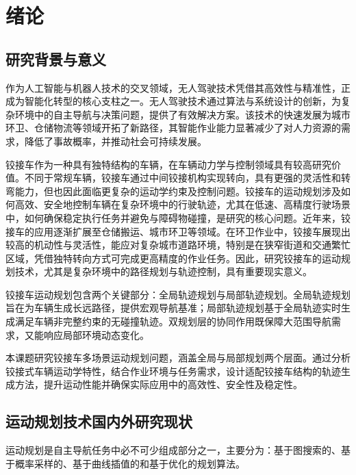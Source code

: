 \documentclass[master,academic]{ysuthesis} %
\begin{document}

	\customizedtableofcontents

	\chapter{绪论}
	\section{研究背景与意义}
	作为人工智能与机器人技术的交叉领域，无人驾驶技术凭借其高效性与精准性，正成为智能化转型的核心支柱之一。无人驾驶技术通过算法与系统设计的创新，为复杂环境中的自主导航与决策问题，提供了有效解决方案。该技术的快速发展为城市环卫、仓储物流等领域开拓了新路径，其智能作业能力显著减少了对人力资源的需求，降低了事故概率，并推动社会可持续发展。

	铰接车作为一种具有独特结构的车辆，在车辆动力学与控制领域具有较高研究价值。不同于常规车辆，铰接车通过中间铰接机构实现转向，具有更强的灵活性和转弯能力，但也因此面临更复杂的运动学约束及控制问题。铰接车的运动规划涉及如何高效、安全地控制车辆在复杂环境中的行驶轨迹，尤其在低速、高精度行驶场景中，如何确保稳定执行任务并避免与障碍物碰撞，是研究的核心问题。近年来，铰接车的应用逐渐扩展至仓储搬运、城市环卫等领域。在环卫作业中，铰接车展现出较高的机动性与灵活性，能应对复杂城市道路环境，特别是在狭窄街道和交通繁忙区域，凭借独特转向方式可完成更高精度的作业任务。因此，研究铰接车的运动规划技术，尤其是复杂环境中的路径规划与轨迹控制，具有重要现实意义。
	
	铰接车运动规划包含两个关键部分：全局轨迹规划与局部轨迹规划。全局轨迹规划旨在为车辆生成长远路径，提供宏观导航基准；局部轨迹规划基于全局轨迹实时生成满足车辆非完整约束的无碰撞轨迹。双规划层的协同作用既保障大范围导航需求，又能响应局部环境动态变化。

	本课题研究铰接车多场景运动规划问题，涵盖全局与局部规划两个层面。通过分析铰接式车辆运动学特性，结合作业环境与任务需求，设计适配铰接车结构的轨迹生成方法，提升运动性能并确保实际应用中的高效性、安全性及稳定性。

	\section{运动规划技术国内外研究现状}
	运动规划是自主导航任务中必不可少组成部分之一，主要分为：基于图搜索的、基于概率采样的、基于曲线插值的和基于优化的规划算法。
\end{document}
